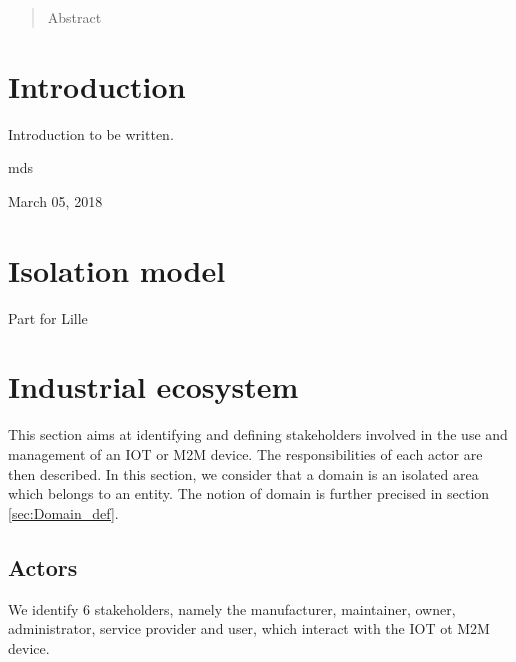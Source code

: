 \documentclass[conference]{IEEEtran}
\begin{document}
\maketitle

\begin{abstract}
Abstract 
\end{abstract}





%
\IEEEpeerreviewmaketitle



\section{Introduction}
\label{sec:Intro}
Introduction to be written. 

\hfill mds
 
\hfill March 05, 2018

\section{Isolation model}
\label{sec:Isolation_model}
Part for Lille 

\section{Industrial ecosystem}
\label{sec:Industrial_ecosystem}
This section aims at identifying and defining stakeholders involved in the use and management of an IOT or M2M device. The responsibilities of each actor are then described. In this section, we consider that a domain is an isolated area which belongs to an entity. The notion of domain is further precised in section \ref{sec:Domain_def}.

\subsection{Actors}
\label{sec:Actors}
We identify 6 stakeholders, namely the manufacturer, maintainer, owner, administrator, service provider and user, which interact with the IOT ot M2M device.
\end{document}
